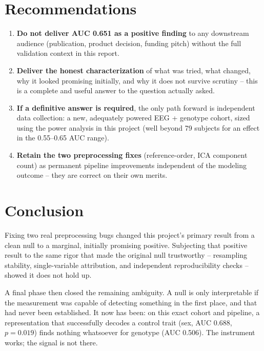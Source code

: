 \documentclass[11pt]{article}
\begin{document}
\section{Recommendations}

\begin{enumerate}[leftmargin=1.2cm]
  \item \textbf{Do not deliver AUC 0.651 as a positive finding} to any
        downstream audience (publication, product decision, funding
        pitch) without the full validation context in this report.
  \item \textbf{Deliver the honest characterization} of what was tried,
        what changed, why it looked promising initially, and why it does
        not survive scrutiny -- this is a complete and useful answer to
        the question actually asked.
  \item \textbf{If a definitive answer is required}, the only path
        forward is independent data collection: a new, adequately
        powered EEG + genotype cohort, sized using the power analysis in
        this project (well beyond 79 subjects for an effect in the
        0.55--0.65 AUC range).
  \item \textbf{Retain the two preprocessing fixes} (reference-order,
        ICA component count) as permanent pipeline improvements
        independent of the modeling outcome -- they are correct on their
        own merits.
\end{enumerate}

\section{Conclusion}

Fixing two real preprocessing bugs changed this project's primary result
from a clean null to a marginal, initially promising positive. Subjecting
that positive result to the same rigor that made the original null
trustworthy -- resampling stability, single-variable attribution, and
independent reproducibility checks -- showed it does not hold up.

A final phase then closed the remaining ambiguity. A null is only
interpretable if the measurement was capable of detecting something in the
first place, and that had never been established. It now has been: on this
exact cohort and pipeline, a representation that successfully decodes a
control trait (sex, AUC 0.688, $p=0.019$) finds nothing whatsoever for
genotype (AUC 0.506). The instrument works; the signal is not there.
\end{document}
